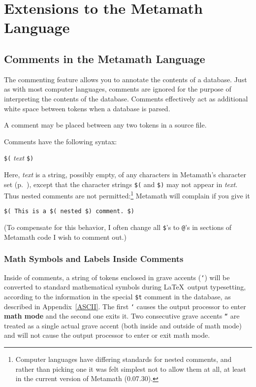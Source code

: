 \section{Extensions to the Metamath Language}

\subsection{Comments in the Metamath Language}\label{comments}

The commenting feature allows you to annotate the contents of
a database.  Just as with most
computer languages, comments are ignored for the purpose of interpreting the
contents of the database. Comments effectively act as
additional white space between tokens
when a database is parsed.

A comment may be placed between any two tokens in a source
file.

Comments have the following syntax:
\begin{center}
 \texttt{\$(} {\em text} \texttt{\$)}
\end{center}
Here, {\em text} is a string, possibly empty, of any
characters in Metamath's character set (p.~\pageref{spec1chars}), except
that the character strings \texttt{\$(} and \texttt{\$)} may not appear
in {\em text}.  Thus nested comments are not
permitted:\footnote{Computer languages have differing standards for
nested comments, and rather than picking one it was felt simplest not to
allow them at all, at least in the current version of Metamath
(0.07.30).} Metamath will
complain if you give it
\begin{center}
 \texttt{\$( This is a \$( nested \$) comment.\ \$)}
\end{center}
(To compensate for this behavior, I often change all \texttt{\$}'s to
\texttt{@}'s in sections of Metamath code I wish to comment out.)

\subsubsection{Math Symbols and Labels Inside Comments}
\label{mathcomments}

Inside of comments, a string of tokens enclosed in grave
accents (\texttt{`}) will be converted
to standard mathematical symbols during \LaTeX\ output
typesetting, according to the information in the
special \texttt{\$t} comment in the database, as described in Appendix~\ref{ASCII}.
The first \texttt{`} causes the output processor to enter {\bf math
mode} and the second one exits it.  Two consecutive
grave accents \texttt{``} are treated as a single actual grave accent
(both inside and outside of math mode) and will not cause the output
processor to enter or exit math mode.

